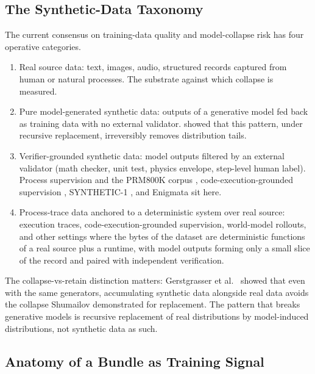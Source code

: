 \documentclass[10pt,twocolumn,letterpaper]{article}
\begin{document}
\subsection{The Synthetic-Data Taxonomy}

The current consensus on training-data quality and model-collapse
risk has four operative categories.
\begin{enumerate}[leftmargin=1.2em]
\item Real source data: text, images, audio, structured records
      captured from human or natural processes. The substrate
      against which collapse is measured.
\item Pure model-generated synthetic data: outputs of a generative
      model fed back as training data with no external validator.
      \citet{shumailov2023curse,shumailov2024nature} showed that
      this pattern, under recursive replacement, irreversibly
      removes distribution tails.
\item Verifier-grounded synthetic data: model outputs filtered by
      an external validator (math checker, unit test, physics
      envelope, step-level human label). Process supervision and
      the PRM800K corpus \citep{lightman2023verify},
      code-execution-grounded supervision \citep{jung2025codeexec},
      SYNTHETIC-1 \citep{primeintellect2025synthetic1}, and
      Enigmata \citep{seed2025enigmata} sit here.
\item Process-trace data anchored to a deterministic system over
      real source: execution traces, code-execution-grounded
      supervision, world-model rollouts, and other settings where
      the bytes of the dataset are deterministic functions of a
      real source plus a runtime, with model outputs forming only a
      small slice of the record and paired with independent
      verification.
\end{enumerate}

The collapse-vs-retain distinction matters: Gerstgrasser et al.\
\citep{gerstgrasser2024accumulate} showed that even with the same
generators, accumulating synthetic data alongside real data avoids
the collapse Shumailov demonstrated for replacement. The pattern
that breaks generative models is recursive replacement of real
distributions by model-induced distributions, not synthetic data
as such.

\subsection{Anatomy of a Bundle as Training Signal}
\end{document}
